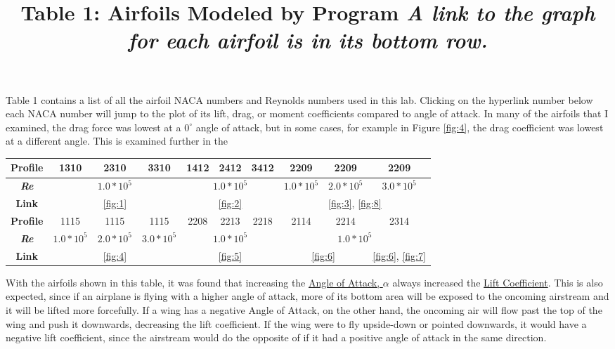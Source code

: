 \documentclass{article}
\begin{document}
Table 1 contains a list of all the airfoil NACA numbers and Reynolds numbers used in this lab. Clicking on the \color{blue}hyperlink number \color{black} below each NACA number will jump to the plot of its lift, drag, or moment coefficients compared to angle of attack. In many of the airfoils that I examined, the drag force was lowest at a $0^{\circ}$ angle of attack, but in some cases, for example in Figure \ref{fig:4}, the drag coefficient was lowest at a different angle. This is examined further in the \newline

\begin{table}[bp]
	\centering
	\title{Table 1: Airfoils Modeled by Program \newline}
	\title{\emph{A link to the graph for each airfoil is in its bottom row.}} \label{table:1}
	\begin{tabular}{ | c | c | c | c | c | c | c | c | c | c |}
		\hline
		 \textbf{Profile} & 1310 & 2310 & 3310 & 1412 & 2412 & 3412 & 2209 & 2209 & 2209 \\ \hline
		 \textbf{\emph{Re}} & \multicolumn{3}{c|}{$1.0*10^5$}  & \multicolumn{3}{c|}{$1.0*10^5$} & $1.0*10^5$ & $2.0*10^5$ & $3.0*10^5$ \\ \hline
		 \textbf{Link} & \multicolumn{3}{c|}{\ref{fig:1}} & \multicolumn{3}{c|}{\ref{fig:2}} & \multicolumn{3}{c|}{\ref{fig:3}, \ref{fig:8}}\\ \hline \hline
		 \newline
		 \textbf{Profile} & 1115 & 1115 & 1115 & 2208 & 2213 & 2218 & 2114 & 2214 & 2314 \\ \hline
		 \textbf{\emph{Re}} & $1.0*10^5$ & $2.0*10^5$ & $3.0*10^5$ & \multicolumn{3}{c|}{$1.0*10^5$} & \multicolumn{3}{c|}{$1.0*10^5$} \\ \hline
		 \textbf{Link} & \multicolumn{3}{c|}{\ref{fig:4}}& \multicolumn{3}{c|}{\ref{fig:5}} & \multicolumn{2}{c|}{\ref{fig:6}} & \ref{fig:6}, \ref{fig:7} \\ \hline
	\end{tabular}
\end{table}

With the airfoils shown in this table, it was found that increasing the \hyperlink{alpha}{Angle of Attack, $\alpha$} always increased the \hyperlink{CL}{Lift Coefficient}. This is also expected, since if an airplane is flying with a higher angle of attack, more of its bottom area will be exposed to the oncoming airstream and it will be lifted more forcefully. If a wing has a negative Angle of Attack, on the other hand, the oncoming air will flow past the top of the wing and push it downwards, decreasing the lift coefficient. If the wing were to fly upside-down or pointed downwards, it would have a negative lift coefficient, since the airstream would do the opposite of if it had a positive angle of attack in the same direction.\newline
\end{document}
